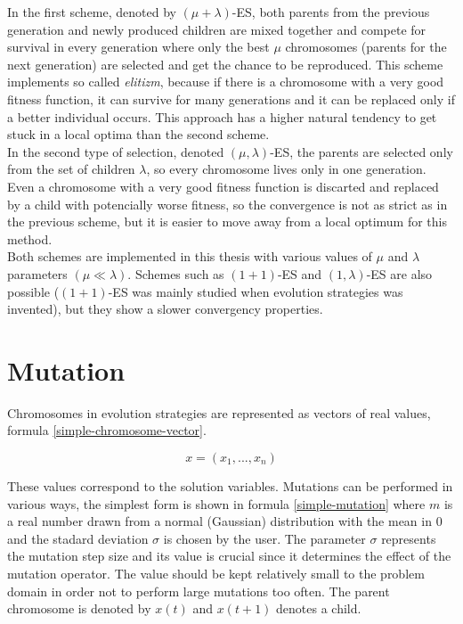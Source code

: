 In the first scheme, denoted by $(\mu + \lambda)$-ES, both parents from the previous generation and newly produced children are mixed together and compete for survival in every generation where only the best $\mu$ chromosomes (parents for the next generation) are selected and get the chance to be reproduced. This scheme implements so called \textit{elitizm}, because if there is a chromosome with a very good fitness function, it can survive for many generations and it can be replaced only if a better individual occurs. This approach has a higher natural tendency to get stuck in a local optima than the second scheme.\\
In the second type of selection, denoted $(\mu,\lambda)$-ES, the parents are selected only from the set of children $\lambda$, so every chromosome lives only in one generation. Even a chromosome with a very good fitness function is discarted and replaced by a child with potencially worse fitness, so the convergence is not as strict as in the previous scheme, but it is easier to move away from a local optimum for this method.\\
Both schemes are implemented in this thesis with various values of $\mu$ and $\lambda$ parameters $(\mu \ll \lambda)$. Schemes such as $(1 + 1)$-ES and $(1, \lambda)$-ES are also possible ($(1 + 1)$-ES was mainly studied when evolution strategies was invented), but they show a slower convergency properties.

\section{Mutation}
Chromosomes in evolution strategies are represented as vectors of real values, formula \ref{simple-chromosome-vector}.

\begin{equation} \label{simple-chromosome-vector}
x = (x_1,...,x_n)
 \end{equation}

 These values correspond to the solution variables. Mutations can be performed in various ways, the simplest form is shown in formula \ref{simple-mutation} where $m$ is a real number drawn from a normal (Gaussian) distribution with the mean in $0$ and the stadard deviation $\sigma$ is chosen by the user. The parameter $\sigma$ represents the mutation step size and its value is crucial since it determines the effect of the mutation operator. The value should be kept relatively small to the problem domain in order not to perform large mutations too often. The parent chromosome is denoted by $x(t)$ and $x(t+1)$ denotes a child.

